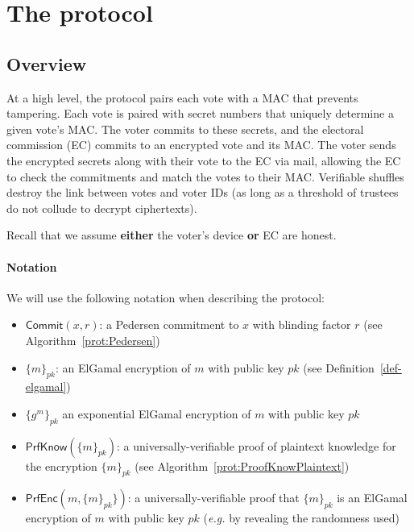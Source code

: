 \documentclass[12pt,a4paper]{article}
\newcommand{\commit}{\mathsf{Commit}}
\theoremstyle{definition}
\newcommand{\eg}{\textit{e.g. }}
\begin{document}
\newpage
\section{The protocol}\label{sec-protocol}
\subsection{Overview}
At a high level, the protocol pairs each vote with a MAC that prevents tampering. Each vote is paired with secret numbers that uniquely determine a given vote's MAC. The voter commits to these secrets, and the electoral commission (EC) commits to an encrypted vote and its MAC. The voter sends the encrypted secrets along with their vote to the EC via mail, allowing the EC to check the commitments and match the votes to their MAC. Verifiable shuffles destroy the link between votes and voter IDs (as long as a threshold of trustees do not collude to decrypt ciphertexts).

Recall that we assume \textbf{either} the voter's device \textbf{or} EC are honest.

\paragraph{Notation}
We will use the following notation when describing the protocol:
\begin{itemize}
    \item $\commit(x, r)$: a Pedersen commitment to $x$ with blinding factor $r$ (see Algorithm~\ref{prot:Pedersen})
    \item $\{m\}_{pk}$: an ElGamal encryption of $m$ with public key $pk$ (see Definition~\ref{def-elgamal})
    \item $\{g^m\}_{pk}$ an exponential ElGamal encryption of $m$ with public key $pk$
    \item $\mathsf{PrfKnow}(\{m\}_{pk})$: a universally-verifiable proof of plaintext knowledge for the encryption $\{m\}_{pk}$ (see Algorithm~\ref{prot:ProofKnowPlaintext})
    \item $\mathsf{PrfEnc}(m, \{m\}_{pk}\})$: a universally-verifiable proof that $\{m\}_{pk}$ is an ElGamal encryption of $m$ with public key $pk$ (\eg by revealing the randomness used)
\end{itemize}
\end{document}
